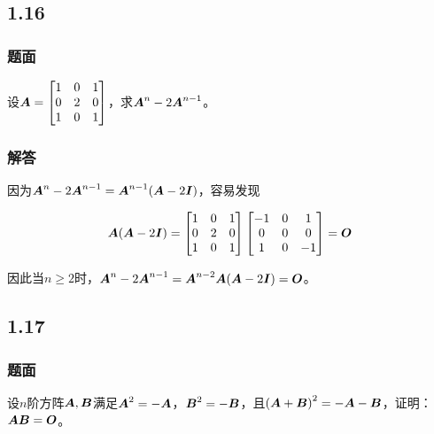 \documentclass{beamer}
\begin{document}
\subsection*{1.16}

\begin{frame}
\frametitle{题面}

设\(\boldsymbol{A}=\begin{bmatrix}1&0&1\\0&2&0\\1&0&1\end{bmatrix}\)，求\(\boldsymbol{A}^n-2\boldsymbol{A}^{n-1}\)。

\end{frame}

\begin{frame}
\frametitle{解答}

    因为\(\boldsymbol{A}^n-2\boldsymbol{A}^{n-1}=\boldsymbol{A}^{n-1}(\boldsymbol{A}-2\boldsymbol{I})\)，容易发现

    \begin{equation*}
        \boldsymbol{A}(\boldsymbol{A}-2\boldsymbol{I})=
        \begin{bmatrix}
            1 & 0 & 1 \\0&2&0\\1&0&1
        \end{bmatrix}
        \begin{bmatrix}
            -1 & 0 & 1 \\0&0&0\\1&0&-1
        \end{bmatrix}=\boldsymbol{O}
    \end{equation*}

    因此当\(n\ge2\)时，\(\boldsymbol{A}^n-2\boldsymbol{A}^{n-1}=\boldsymbol{A}^{n-2}\boldsymbol{A}(\boldsymbol{A}-2\boldsymbol{I})=\boldsymbol{O}\)。

\end{frame}

\subsection*{1.17}

\begin{frame}
\frametitle{题面}

设\(n\)阶方阵\(\boldsymbol{A},\boldsymbol{B}\)满足\(\boldsymbol{A}^2=-\boldsymbol{A}\)，\(\boldsymbol{B}^2=-\boldsymbol{B}\)，且\(\left( \boldsymbol{A}+\boldsymbol{B} \right)^2=-\boldsymbol{A}-\boldsymbol{B}\)，证明：\(\boldsymbol{A}\boldsymbol{B}=\boldsymbol{O}\)。

\end{frame}
\end{document}
